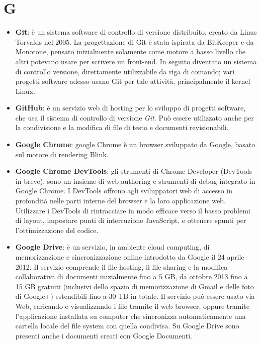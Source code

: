 \section{G}
\begin{itemize}
	\item
	\textbf{Git}: è un sistema software di controllo di versione distribuito, creato da Linus Torvalds nel 2005.
	La progettazione di Git è stata ispirata da BitKeeper e da Monotone, pensato 	inizialmente solamente come motore a basso livello che altri potevano usare per scrivere un front-end. In seguito diventato un sistema di controllo versione, direttamente utilizzabile da riga di comando; vari progetti software adesso usano Git per tale attività, principalmente il kernel Linux.
	\item
	\textbf{GitHub}: è un servizio web di hosting per lo sviluppo di progetti software, che usa il sistema di controllo di versione \textit{Git}. Può essere utilizzato anche per la condivisione e la modifica di file di testo e documenti revisionabili. 
	\item
	\textbf{Google Chrome}: google Chrome è un browser sviluppato da Google, basato sul motore di rendering Blink.
	\item
	\textbf{Google Chrome DevTools}: gli strumenti di Chrome Developer (DevTools in breve), sono un insieme di web authoring e strumenti di debug integrato in Google Chrome. I DevTools offrono agli sviluppatori web di accesso in profondità nelle parti interne del browser e la loro applicazione web. Utilizzare i DevTools di rintracciare in modo efficace verso il basso problemi di layout, impostare punti di interruzione JavaScript, e ottenere spunti per l'ottimizzazione del codice.
	\item
	\textbf{Google Drive}: è un servizio, in ambiente cloud computing, di memorizzazione e sincronizzazione online introdotto da Google il 24 aprile 2012. Il servizio comprende il file hosting, il file sharing e la modifica collaborativa di documenti inizialmente fino a 5 GB, da ottobre 2013 fino a 15 GB gratuiti (inclusivi dello spazio di memorizzazione di Gmail e delle foto di Google+) estendibili fino a 30 TB in totale. Il servizio può essere usato via Web, caricando e visualizzando i file tramite il web browser, oppure tramite l'applicazione installata su computer che sincronizza automaticamente una cartella locale del file system con quella condivisa. Su Google Drive sono presenti anche i documenti creati con Google Documenti.
\end{itemize}
